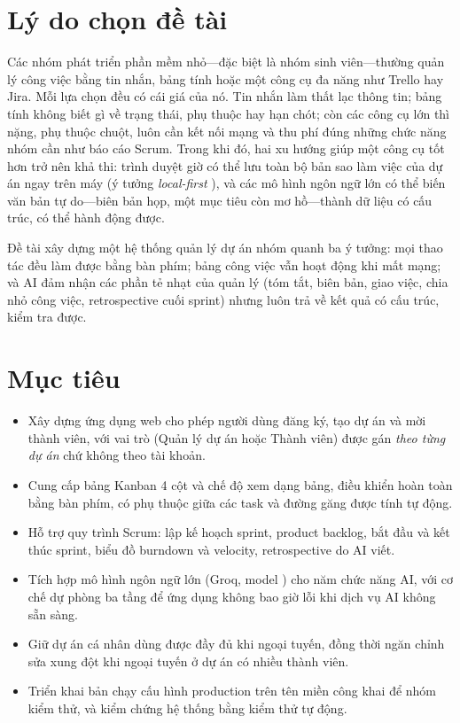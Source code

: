 \documentclass[../main.tex]{subfiles}
\begin{document}
\section{Lý do chọn đề tài}
Các nhóm phát triển phần mềm nhỏ---đặc biệt là nhóm sinh viên---thường quản lý công việc bằng tin
nhắn, bảng tính hoặc một công cụ đa năng như Trello hay Jira. Mỗi lựa chọn đều có cái giá của nó.
Tin nhắn làm thất lạc thông tin; bảng tính không biết gì về trạng thái, phụ thuộc hay hạn chót; còn
các công cụ lớn thì nặng, phụ thuộc chuột, luôn cần kết nối mạng và thu phí đúng những chức năng nhóm
cần như báo cáo Scrum. Trong khi đó, hai xu hướng giúp một công cụ tốt hơn trở nên khả thi: trình
duyệt giờ có thể lưu toàn bộ bản sao làm việc của dự án ngay trên máy (ý tưởng \emph{local-first}
\cite{kleppmann2019localfirst}), và các mô hình ngôn ngữ lớn có thể biến văn bản tự do---biên bản
họp, một mục tiêu còn mơ hồ---thành dữ liệu có cấu trúc, có thể hành động được.

Đề tài xây dựng một hệ thống quản lý dự án nhóm quanh ba ý tưởng: mọi thao tác đều làm
được bằng bàn phím; bảng công việc vẫn hoạt động khi mất mạng; và AI đảm nhận các phần tẻ nhạt của
quản lý (tóm tắt, biên bản, giao việc, chia nhỏ công việc, retrospective cuối sprint) nhưng luôn
trả về kết quả có cấu trúc, kiểm tra được.

\section{Mục tiêu}
\begin{itemize}
  \item Xây dựng ứng dụng web cho phép người dùng đăng ký, tạo dự án và mời thành viên, với vai trò
        (Quản lý dự án hoặc Thành viên) được gán \emph{theo từng dự án} chứ không theo tài khoản.
  \item Cung cấp bảng Kanban 4 cột và chế độ xem dạng bảng, điều khiển hoàn toàn bằng bàn phím, có
        phụ thuộc giữa các task và đường găng được tính tự động.
  \item Hỗ trợ quy trình Scrum: lập kế hoạch sprint, product backlog, bắt đầu và kết thúc sprint,
        biểu đồ burndown và velocity, retrospective do AI viết.
  \item Tích hợp mô hình ngôn ngữ lớn (Groq, model ) cho năm chức năng AI,
        với cơ chế dự phòng ba tầng để ứng dụng không bao giờ lỗi khi dịch vụ AI không sẵn sàng.
  \item Giữ dự án cá nhân dùng được đầy đủ khi ngoại tuyến, đồng thời ngăn chỉnh sửa xung đột khi
        ngoại tuyến ở dự án có nhiều thành viên.
  \item Triển khai bản chạy cấu hình production trên tên miền công khai để nhóm kiểm thử, và kiểm
        chứng hệ thống bằng kiểm thử tự động.
\end{itemize}
\end{document}
